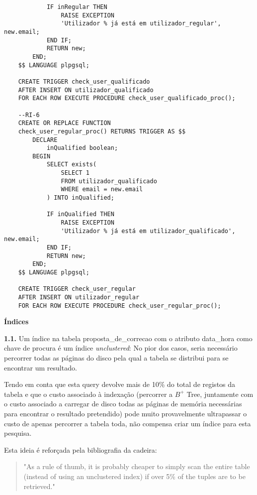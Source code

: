 \documentclass[12pt]{report}
\begin{document}
\begin{verbatim}
            IF inRegular THEN
                RAISE EXCEPTION
                'Utilizador % já está em utilizador_regular', new.email;
            END IF;
            RETURN new;
        END;
    $$ LANGUAGE plpgsql;

    CREATE TRIGGER check_user_qualificado
    AFTER INSERT ON utilizador_qualificado
    FOR EACH ROW EXECUTE PROCEDURE check_user_qualificado_proc();

    --RI-6
    CREATE OR REPLACE FUNCTION
    check_user_regular_proc() RETURNS TRIGGER AS $$
        DECLARE
            inQualified boolean;
        BEGIN
            SELECT exists(
                SELECT 1
                FROM utilizador_qualificado
                WHERE email = new.email
            ) INTO inQualified;

            IF inQualified THEN
                RAISE EXCEPTION
                'Utilizador % já está em utilizador_qualificado', new.email;
            END IF;
            RETURN new;
        END;
    $$ LANGUAGE plpgsql;

    CREATE TRIGGER check_user_regular
    AFTER INSERT ON utilizador_regular
    FOR EACH ROW EXECUTE PROCEDURE check_user_regular_proc();
    \end{verbatim}
    \normalsize

    \newpage
    \Large
    \textbf{Índices}
    \normalsize \\
    \par \textbf{1.1.} Um índice na tabela proposta\_de\_correcao com o atributo data\_hora como chave de procura é um índice \textit{unclustered}: No pior dos casos, seria necessário percorrer todas as páginas do disco pela qual a tabela se distribui para se encontrar um resultado.

    \par Tendo em conta que esta query devolve mais de 10\% do total de registos da tabela e que o custo associado à indexação (percorrer a $B^+$ Tree, juntamente com o custo associado a carregar de disco todas as páginas de memória necessárias para encontrar o resultado pretendido) pode muito provavelmente ultrapassar o custo de apenas percorrer a tabela toda, não compensa criar um índice para esta pesquisa.

    \par Esta ideia é reforçada pela bibliografia da cadeira:
    \begin{quotation}
        "As a rule of thumb, it is probably cheaper to simply scan the entire table (instead of using an unclustered index) if over 5\% of the tuples are to be retrieved."
    \end{quotation}
\end{document}
